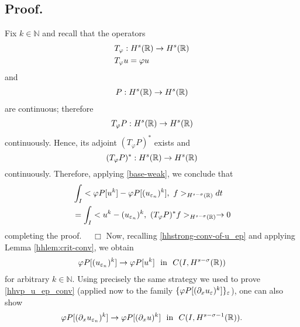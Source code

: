 		\subsection{ Proof.} 
		Fix $k \in \mathbb{N}$ and recall that the operators 
		\begin{equation*}
			\begin{split}
			 & T_\varphi: H^s(\mathbb{R}) \to H^s(\mathbb{R})\\
			 & T_\varphi u = \varphi u
		\end{split}
	\end{equation*}
and 
\begin{equation*}
	\begin{split}
		P:H^s(\mathbb{R}) \to H^s(\mathbb{R})
	\end{split}
\end{equation*}
	are continuous; therefore 
	\begin{equation*}
		\begin{split}
			T_\varphi P: H^s(\mathbb{R}) \to H^s(\mathbb{R})
		\end{split}
	\end{equation*}
	continuously. Hence, its adjoint  $(T_\varphi P)^*$
	exists and
		\begin{equation*}
			(T_\varphi P)^*: H^s(\mathbb{R}) \to H^s(\mathbb{R}) 
		\end{equation*}
		continuously. Therefore, applying \eqref{base-weak}, we conclude that
		\begin{equation}
			\label{widpseudo}
			\begin{split}
				& \int_I <\varphi P[u^k] - \varphi
				P [(u_{\varepsilon_n})^k],\  f>_{H^{s-\sigma }(\mathbb{R})} dt
				\\
				&= \int_I <u^k - 
				 (u_{\varepsilon_n})^k, \ (T_\varphi P)^* f>_{H^{s-\sigma }(\mathbb{R})} \to 0
			\end{split}
		\end{equation}
		completing the proof. $\quad \Box$
		Now, recalling \eqref{hhstrong-conv-of-u_ep} and applying Lemma
		\ref{hhlem:crit-conv}, we obtain
			\begin{equation}
			\begin{split}
				\vp P [(u_{\ee_n})^k] \to \vp P [u^k] \ \ \text{in}  \ \ C(I,
				H^{s-\sigma}(\rr))
				\label{hhvp_u_ep_conv}
			\end{split}
		\end{equation}
		for arbitrary $k \in \mathbb{N}$.  Using precisely the same
		strategy we used to prove \eqref{hhvp_u_ep_conv} (applied now to
		the family $\{ \varphi P [(\partial_x u_{\varepsilon})^k] \}_\varepsilon$), one can also show
	\begin{equation}
			\begin{split}
			\vp P [ (\p_x u_{\ee_n})^k] \to \vp P [(\p_x u)^k] \ \ \text{in}  \ \ C(I,
				H^{s-\sigma -1 }(\rr)).
			\end{split}
		\end{equation}

